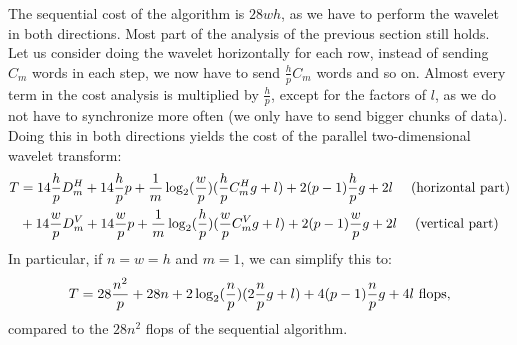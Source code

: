 The sequential cost of the algorithm is $28wh$, as we have to perform the wavelet in both directions. Most part of the analysis of the previous section still holds. Let us consider doing the wavelet horizontally for each row, instead of sending $C_m$ words in each step, we now have to send $\frac{h}{p}C_m$ words and so on. Almost every term in the cost analysis is multiplied by $\frac{h}{p}$, except for the factors of $l$, as we do not have to synchronize more often (we only have to send bigger chunks of data). Doing this in both directions yields the cost of the parallel two-dimensional wavelet transform:
\begin{align*}
	T &= 14\frac{h}{p}D_m^H + 14\frac{h}{p}p + \frac{1}{m}\operatorname{\log_2}(\frac{w}{p})(\frac{h}{p}C_m^Hg+l) + 2(p-1)\frac{h}{p}g + 2l \quad\text{ (horizontal part)}\\
	  &+ 14\frac{w}{p}D_m^V + 14\frac{w}{p}p + \frac{1}{m}\operatorname{\log_2}(\frac{h}{p})(\frac{w}{p}C_m^Vg+l) + 2(p-1)\frac{w}{p}g + 2l \quad\text{ (vertical part)}
\end{align*}
In particular, if $n=w=h$ and $m=1$, we can simplify this to:
\[ T = 28\frac{n^2}{p} + 28n + 2\operatorname{\log_2}(\frac{n}{p})(2\frac{n}{p}g+l) + 4(p-1)\frac{n}{p}g + 4l \text{ flops}, \]
compared to the $28n^2$ flops of the sequential algorithm.

